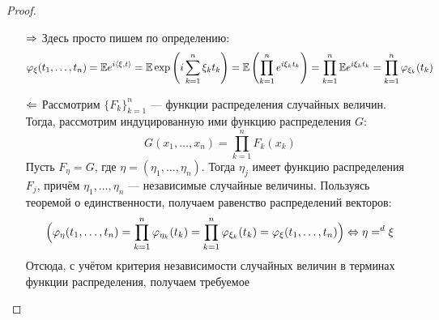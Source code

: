 \begin{proof}~
	\begin{itemize}
		\item[$\Rightarrow$] Здесь просто пишем по определению:
		\[
			\varphi_\xi(t_1, \ldots, t_n) = \mathbb{E} e^{i\left\langle\xi, t\right\rangle} = \mathbb{E}\exp\left(i \sum_{k = 1}^n \xi_k t_k\right) = \mathbb{E}\left(\prod_{k = 1}^n e^{i\xi_k t_k}\right) = \prod_{k = 1}^n \mathbb{E} e^{i\xi_k t_k} = \prod_{k = 1}^n \varphi_{\xi_k}(t_k)
		\]
		
		\item[$\Leftarrow$] Рассмотрим $\{F_k\}_{k = 1}^n$ --- функции распределения случайных величин. Тогда, рассмотрим индуцированную ими функцию распределения $G$:
		\[
			G(x_1, \ldots, x_n) = \prod_{k = 1}^n F_k(x_k)
		\]
		Пусть $F_\eta = G$, где $\eta = (\eta_1, \ldots, \eta_n)$. Тогда $\eta_j$ имеет функцию распределения $F_j$, причём $\eta_1, \ldots, \eta_n$ --- независимые случайные величины. Пользуясь теоремой о единственности, получаем равенство распределений векторов:
		\[
			\Big(\varphi_\eta(t_1, \ldots, t_n) = \prod_{k = 1}^n \varphi_{\eta_k}(t_k) = \prod_{k = 1}^n \varphi_{\xi_k}(t_k) = \varphi_\xi(t_1, \ldots, t_n)\Big) \Leftrightarrow \eta =^d \xi
		\]
		Отсюда, с учётом критерия независимости случайных величин в терминах функции распределения, получаем требуемое
	\end{itemize}
\end{proof}